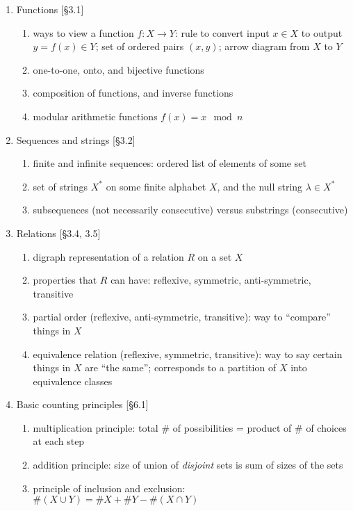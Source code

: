 \documentclass[11pt]{article}
\begin{document}
\begin{enumerate}
\item Functions [\S3.1]
\begin{enumerate}
\item ways to view a function $f\colon X \to Y$: rule to convert input $x\in X$ to output $y=f(x)\in Y$; set of ordered pairs $(x,y)$; arrow diagram from $X$ to $Y$
\item one-to-one, onto, and bijective functions
\item composition of functions, and inverse functions
\item modular arithmetic functions $f(x) = x \mod n$
\end{enumerate}

\item Sequences and strings [\S3.2]
\begin{enumerate}
\item finite and infinite sequences: ordered list of elements of some set
\item set of strings $X^*$ on some finite alphabet $X$, and the null string $\lambda \in X^*$
\item subsequences (not necessarily consecutive) versus substrings (consecutive)
\end{enumerate}

\item Relations [\S3.4, 3.5]
\begin{enumerate}
\item digraph representation of a relation $R$ on a set $X$
\item properties that $R$ can have: reflexive, symmetric, anti-symmetric, transitive
\item partial order (reflexive, anti-symmetric, transitive): way to ``compare'' things in $X$
\item equivalence relation (reflexive, symmetric, transitive): way to say certain things in $X$ are ``the same''; corresponds to a partition of $X$ into equivalence classes
\end{enumerate}

\item Basic counting principles [\S6.1]
\begin{enumerate}
\item multiplication principle: total $\#$ of possibilities = product of $\#$ of choices at each step
\item addition principle: size of union of \emph{disjoint} sets is sum of sizes of the sets
\item principle of inclusion and exclusion: $\#(X \cup Y) = \#X + \#Y - \# (X \cap Y)$
\end{enumerate}


\end{enumerate}
\end{document}

